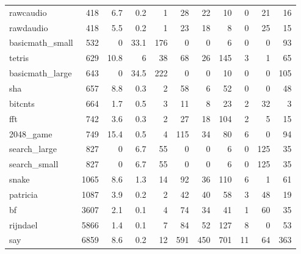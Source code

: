 \begin{tabular}{lrrrrrrrrrr}
 rawcaudio       &            418 &      6.7 &    0.2 &    1 &     28 &         22 &           10 &     0 &    21 &    16 \\
 rawdaudio       &            418 &      5.5 &    0.2 &    1 &     23 &         18 &            8 &     0 &    25 &    15 \\
 basicmath\_small &            532 &      0   &   33.1 &  176 &      0 &          0 &            6 &     0 &     0 &    93 \\
 tetris          &            629 &     10.8 &    6   &   38 &     68 &         26 &          145 &     3 &     1 &    65 \\
 basicmath\_large &            643 &      0   &   34.5 &  222 &      0 &          0 &           10 &     0 &     0 &   105 \\
 sha             &            657 &      8.8 &    0.3 &    2 &     58 &          6 &           52 &     0 &     0 &    48 \\
 bitcnts         &            664 &      1.7 &    0.5 &    3 &     11 &          8 &           23 &     2 &    32 &     3 \\
 fft             &            742 &      3.6 &    0.3 &    2 &     27 &         18 &          104 &     2 &     5 &    15 \\
 2048\_game       &            749 &     15.4 &    0.5 &    4 &    115 &         34 &           80 &     6 &     0 &    94 \\
 search\_large    &            827 &      0   &    6.7 &   55 &      0 &          0 &            6 &     0 &   125 &    35 \\
 search\_small    &            827 &      0   &    6.7 &   55 &      0 &          0 &            6 &     0 &   125 &    35 \\
 snake           &           1065 &      8.6 &    1.3 &   14 &     92 &         36 &          110 &     6 &     1 &    61 \\
 patricia        &           1087 &      3.9 &    0.2 &    2 &     42 &         40 &           58 &     3 &    48 &    19 \\
 bf              &           3607 &      2.1 &    0.1 &    4 &     74 &         34 &           41 &     1 &    60 &    35 \\
 rijndael        &           5866 &      1.4 &    0.1 &    7 &     84 &         52 &          127 &     8 &     0 &    53 \\
 say             &           6859 &      8.6 &    0.2 &   12 &    591 &        450 &          701 &    11 &    64 &   363 \\

\end{tabular}
